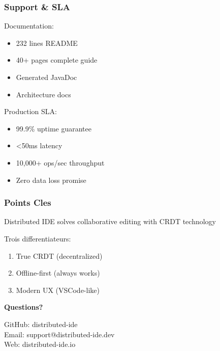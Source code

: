 \documentclass[aspectratio=16:9]{beamer}
\begin{document}
\begin{frame}
  \frametitle{Support \& SLA}
  
  Documentation:
  \begin{itemize}
    \item 232 lines README
    \item 40+ pages complete guide
    \item Generated JavaDoc
    \item Architecture docs
  \end{itemize}
  
  \bigskip
  
  Production SLA:
  \begin{itemize}
    \item 99.9\% uptime guarantee
    \item <50ms latency
    \item 10,000+ ops/sec throughput
    \item Zero data loss promise
  \end{itemize}
\end{frame}


\begin{frame}
  \frametitle{Points Cles}
  
  \centering
  
  \Large
  
  Distributed IDE solves collaborative editing with CRDT technology
  
  \bigskip
  
  \normalsize
  
  Trois differentiateurs:
  \begin{enumerate}
    \item True CRDT (decentralized)
    \item Offline-first (always works)
    \item Modern UX (VSCode-like)
  \end{enumerate}
\end{frame}

{
\begin{frame}[plain]
  \centering
  \vspace{2cm}
  {\fontsize{60}{70}\selectfont\textbf{\textcolor{DistribIDEBlue}{Questions?}}}
  
  \vspace{1cm}
  
  {\small GitHub: distributed-ide}\\
  {\small Email: support@distributed-ide.dev}\\
  {\small Web: distributed-ide.io}
\end{frame}
}
\end{document}
